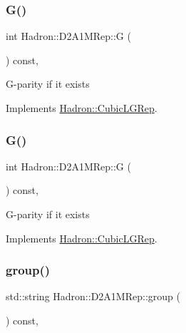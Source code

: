 \subsubsection{\texorpdfstring{G()}{G()}\hspace{0.1cm}{\footnotesize\ttfamily [2/3]}}
{\footnotesize\ttfamily int Hadron\+::\+D2\+A1\+M\+Rep\+::G (\begin{DoxyParamCaption}{ }\end{DoxyParamCaption}) const\hspace{0.3cm}{\ttfamily [inline]}, {\ttfamily [virtual]}}

G-\/parity if it exists 

Implements \mbox{\hyperlink{structHadron_1_1CubicLGRep_ace26f7b2d55e3a668a14cb9026da5231}{Hadron\+::\+Cubic\+L\+G\+Rep}}.

\mbox{\label{structHadron_1_1D2A1MRep_a0778e49dc6d5a6cfa12f824a75b23b4b}} 
\subsubsection{\texorpdfstring{G()}{G()}\hspace{0.1cm}{\footnotesize\ttfamily [3/3]}}
{\footnotesize\ttfamily int Hadron\+::\+D2\+A1\+M\+Rep\+::G (\begin{DoxyParamCaption}{ }\end{DoxyParamCaption}) const\hspace{0.3cm}{\ttfamily [inline]}, {\ttfamily [virtual]}}

G-\/parity if it exists 

Implements \mbox{\hyperlink{structHadron_1_1CubicLGRep_ace26f7b2d55e3a668a14cb9026da5231}{Hadron\+::\+Cubic\+L\+G\+Rep}}.

\mbox{\label{structHadron_1_1D2A1MRep_a8d1ad4d399b153870478b6e636ee0131}} 
\subsubsection{\texorpdfstring{group()}{group()}\hspace{0.1cm}{\footnotesize\ttfamily [1/3]}}
{\footnotesize\ttfamily std\+::string Hadron\+::\+D2\+A1\+M\+Rep\+::group (\begin{DoxyParamCaption}{ }\end{DoxyParamCaption}) const\hspace{0.3cm}{\ttfamily [inline]}, {\ttfamily [virtual]}}

